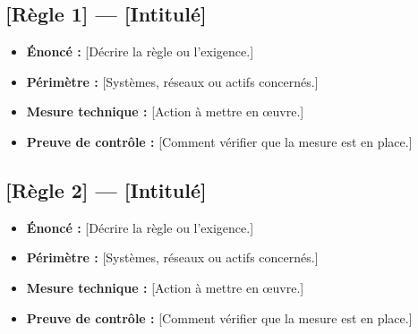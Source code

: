 \documentclass[11pt,a4paper]{article}
\begin{document}
  \subsection{[Règle 1] --- [Intitulé]}

  \begin{itemize}
    \item \textbf{Énoncé :} [Décrire la règle ou l'exigence.]
    \item \textbf{Périmètre :} [Systèmes, réseaux ou actifs concernés.]
    \item \textbf{Mesure technique :} [Action à mettre en œuvre.]
    \item \textbf{Preuve de contrôle :} [Comment vérifier que la mesure est en place.]
  \end{itemize}

  \subsection{[Règle 2] --- [Intitulé]}

  \begin{itemize}
    \item \textbf{Énoncé :} [Décrire la règle ou l'exigence.]
    \item \textbf{Périmètre :} [Systèmes, réseaux ou actifs concernés.]
    \item \textbf{Mesure technique :} [Action à mettre en œuvre.]
    \item \textbf{Preuve de contrôle :} [Comment vérifier que la mesure est en place.]
  \end{itemize}

\end{document}
